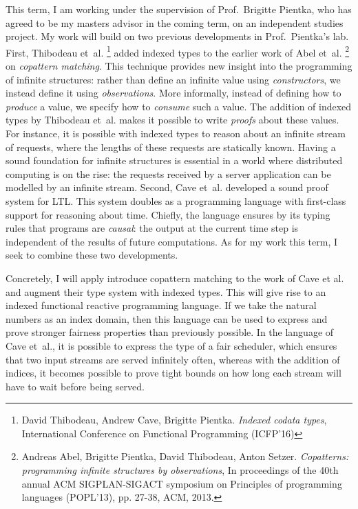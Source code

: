\documentclass[11pt,letterpaper]{article}
\begin{document}
This term, I am working under the supervision of Prof.~Brigitte Pientka, who
has agreed to be my masters advisor in the coming term, on an independent
studies project. My work will build on two previous developments in
Prof.~Pientka's lab.
First, Thibodeau et~al.%
\footnote{%
  David Thibodeau, Andrew Cave, Brigitte Pientka.
  \emph{Indexed codata types},
  International Conference on Functional Programming (ICFP'16)
}
added indexed types to the earlier work of Abel et~al.%
\footnote{%
  Andreas Abel, Brigitte Pientka, David Thibodeau, Anton Setzer.
  \emph{Copatterns: programming infinite structures by observations},
  In proceedings of the 40th annual ACM SIGPLAN-SIGACT symposium on Principles
  of programming languages (POPL'13),
  pp. 27-38, ACM, 2013.
}
on \emph{copattern matching}.
This technique provides new insight into the programming of infinite
structures: rather than define an infinite value using \emph{constructors}, we
instead define it using \emph{observations}.
More informally, instead of defining how to \emph{produce} a value, we specify
how to \emph{consume} such a value.
The addition of indexed types by Thibodeau et~al. makes it possible to write
\emph{proofs} about these values.
For instance, it is possible with indexed types to reason about an infinite
stream of requests, where the lengths of these requests are statically known.
Having a sound foundation for infinite structures is essential in a world where
distributed computing is on the rise: the requests received by a server
application can be modelled by an infinite stream.
%
Second, Cave et~al. developed a sound proof system for LTL\footnotemark.
This system doubles as a programming language with first-class support for
reasoning about time.
Chiefly, the language ensures by its typing rules that programs are
\emph{causal}: the output at the current time step is independent of the
results of future computations.
%
%
%
As for my work this term, I seek to combine these two developments.

Concretely, I will apply introduce copattern matching to the work of Cave et
al. and augment their type system with indexed types.
This will give rise to an indexed functional reactive programming language.
If we take the natural numbers as an index domain, then this language can be
used to express and prove stronger fairness properties than previously
possible. In the language of Cave et~al., it is possible to express the
type of a fair scheduler, which ensures that two input streams are served
infinitely often, whereas with the addition of indices, it becomes possible to
prove tight bounds on how long each stream will have to wait before being
served.
\end{document}
